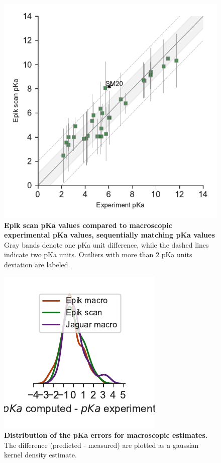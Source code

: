 \documentclass[9pt,lineno,final]{elife}
\begin{document}
\begin{figure}[hbtp]
	\centering
	\includegraphics[]{Reports/Experiment-Epik-scan-align-correlation.pdf}	
	\caption{{\bf Epik scan pKa values compared to macroscopic experimental pKa values, sequentially matching pKa values}  Gray bands denote one pKa unit difference, while the dashed lines indicate two pKa units. Outliers with more than 2 pKa units deviation are labeled.}
\end{figure}


\begin{figure}
 \centering
 \includegraphics{Reports/overview-align-distribution.pdf}
 \caption{{\bf Distribution of the pKa errors for macroscopic estimates.} The difference (predicted - measured) are plotted as a gaussian kernel density estimate.}
\end{figure}
\end{document}
